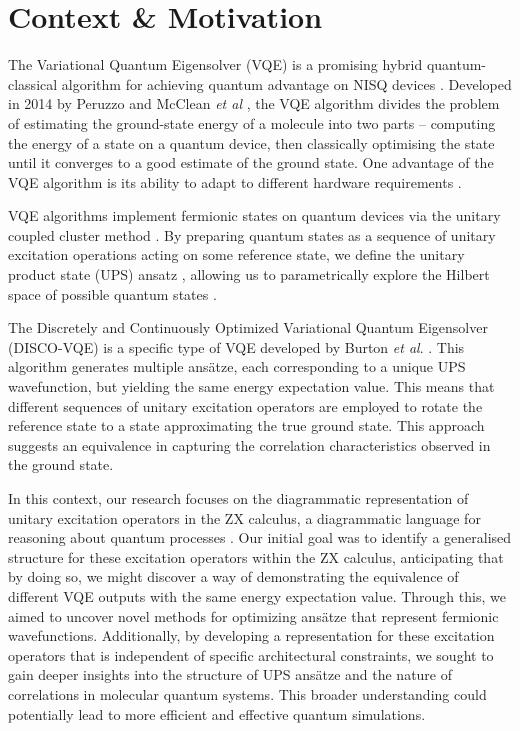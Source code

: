 \section{Context \& Motivation}%
\label{context-motivation}

The Variational Quantum Eigensolver (VQE) is a promising hybrid quantum-classical algorithm for achieving quantum advantage on NISQ devices \cite{Cerezo2020}. Developed in 2014 by Peruzzo and McClean \textit{et al} \cite{Peruzzo2014}, the VQE algorithm divides the problem of estimating the ground-state energy of a molecule into two parts -- computing the energy of a state on a quantum device, then classically optimising the state until it converges to a good estimate of the ground state. One advantage of the VQE algorithm is its ability to adapt to different hardware requirements \cite{McClean2016}.

VQE algorithms implement fermionic states on quantum devices via the unitary coupled cluster method \cite{Taube2006}. By preparing quantum states as a sequence of unitary excitation operations acting on some reference state, we define the unitary product state (UPS) ansatz \cite{Burton2023}, allowing us to parametrically explore the Hilbert space of possible quantum states \cite{McClean2016}.

The Discretely and Continuously Optimized Variational Quantum Eigensolver (DISCO-VQE) is a specific type of VQE developed by Burton \textit{et al}. \cite{Burton2023}. This algorithm generates multiple ansätze, each corresponding to a unique UPS wavefunction, but yielding the same energy expectation value. This means that different sequences of unitary excitation operators are employed to rotate the reference state to a state approximating the true ground state. This approach suggests an equivalence in capturing the correlation characteristics observed in the ground state.

In this context, our research focuses on the diagrammatic representation of unitary excitation operators in the ZX calculus, a diagrammatic language for reasoning about quantum processes \cite{Coecke2011}. Our initial goal was to identify a generalised structure for these excitation operators within the ZX calculus, anticipating that by doing so, we might discover a way of demonstrating the equivalence of different VQE outputs with the same energy expectation value. Through this, we aimed to uncover novel methods for optimizing ansätze that represent fermionic wavefunctions. Additionally, by developing a representation for these excitation operators that is independent of specific architectural constraints, we sought to gain deeper insights into the structure of UPS ansätze and the nature of correlations in molecular quantum systems. This broader understanding could potentially lead to more efficient and effective quantum simulations.


